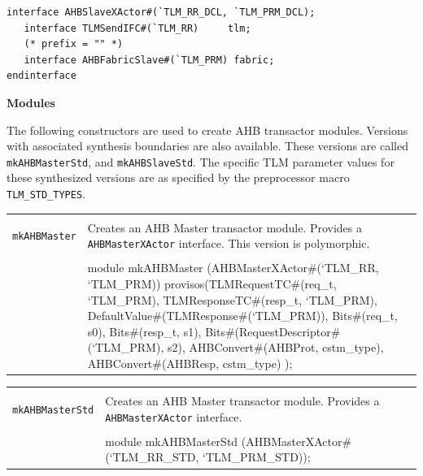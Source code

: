 \documentclass[twoside,letterpaper]{article}
\newcommand{\te}[1]{\texttt{#1}}
\newenvironment{libverbatim}
  {\vspace*{-1.0em}
   \verbatim}
  {\endverbatim
  }
\begin{document}

\begin{verbatim}
interface AHBSlaveXActor#(`TLM_RR_DCL, `TLM_PRM_DCL);
   interface TLMSendIFC#(`TLM_RR)     tlm;
   (* prefix = "" *)
   interface AHBFabricSlave#(`TLM_PRM) fabric;
endinterface
\end{verbatim}

{\bf Modules}

The following constructors are used to create AHB transactor modules.  Versions
with associated synthesis boundaries are also available. These
versions are called \te{mkAHBMasterStd}, and \te{mkAHBSlaveStd}. The specific TLM 
parameter values for these synthesized versions are as specified by the 
preprocessor macro \te{TLM\_STD\_TYPES}.



\begin{center}
\begin{tabular}{|p{1.2 in}|p{5 in}|}
\hline 
&\\
\te{mkAHBMaster}&Creates an AHB Master transactor module. Provides a
\te{AHBMasterXActor} interface.  This version is polymorphic.   \\
&\\
\cline{2-2}
&\begin{libverbatim}
module mkAHBMaster (AHBMasterXActor#(`TLM_RR, `TLM_PRM))
   provisos(TLMRequestTC#(req_t, `TLM_PRM),
            TLMResponseTC#(resp_t, `TLM_PRM),
            DefaultValue#(TLMResponse#(`TLM_PRM)),
            Bits#(req_t, s0),
            Bits#(resp_t, s1),
            Bits#(RequestDescriptor#(`TLM_PRM), s2),
            AHBConvert#(AHBProt, cstm_type),
            AHBConvert#(AHBResp, cstm_type)
	    );
\end{libverbatim}
\\
\hline
\end{tabular}
\end{center}



\begin{center}
\begin{tabular}{|p{1.2 in}|p{5 in}|}
\hline 
&\\
\te{mkAHBMasterStd}&Creates an AHB Master transactor module. Provides a
\te{AHBMasterXActor} interface.   \\
&\\
\cline{2-2}
&\begin{libverbatim}
module mkAHBMasterStd (AHBMasterXActor#(`TLM_RR_STD, `TLM_PRM_STD));
\end{libverbatim}
\\
\hline
\end{tabular}
\end{center}
\end{document}
